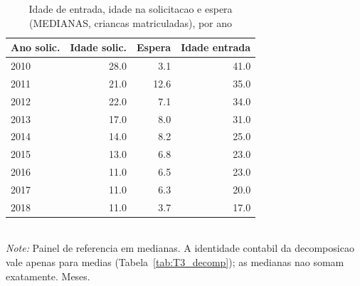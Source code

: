 \begin{table}[htbp]\centering
\caption{Idade de entrada, idade na solicitacao e espera (MEDIANAS, criancas matriculadas), por ano}
\label{tab:T3_medianas}
\small
\setlength{\tabcolsep}{4pt}
\begin{tabular}{lrrr}
\toprule
Ano solic. & Idade solic. & Espera & Idade entrada \\
\midrule
2010 & 28.0 & 3.1 & 41.0 \\
2011 & 21.0 & 12.6 & 35.0 \\
2012 & 22.0 & 7.1 & 34.0 \\
2013 & 17.0 & 8.0 & 31.0 \\
2014 & 14.0 & 8.2 & 25.0 \\
2015 & 13.0 & 6.8 & 23.0 \\
2016 & 11.0 & 6.5 & 23.0 \\
2017 & 11.0 & 6.3 & 20.0 \\
2018 & 11.0 & 3.7 & 17.0 \\
\bottomrule
\end{tabular}
\\[3pt]{\footnotesize \textit{Note:} Painel de referencia em medianas. A identidade contabil da decomposicao vale apenas para medias (Tabela~\ref{tab:T3_decomp}); as medianas nao somam exatamente. Meses.}
\end{table}
